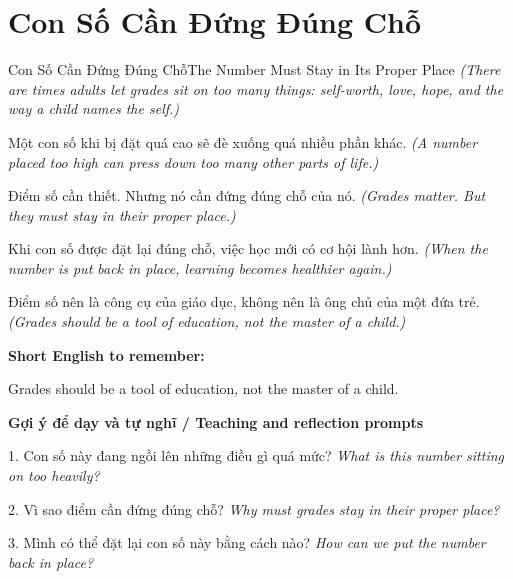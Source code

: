 \section{Con Số Cần Đứng Đúng Chỗ}
\begin{truyen}{Con Số Cần Đứng Đúng Chỗ}{The Number Must Stay in Its Proper Place}
\textit{(There are times adults let grades sit on too many things: self-worth, love, hope, and the way a child names the self.)}

Một con số khi bị đặt quá cao sẽ đè xuống quá nhiều phần khác.
\textit{(A number placed too high can press down too many other parts of life.)}

Điểm số cần thiết. Nhưng nó cần đứng đúng chỗ của nó.
\textit{(Grades matter. But they must stay in their proper place.)}

Khi con số được đặt lại đúng chỗ, việc học mới có cơ hội lành hơn.
\textit{(When the number is put back in place, learning becomes healthier again.)}

\end{truyen}

\begin{baihoc}
Điểm số nên là công cụ của giáo dục, không nên là ông chủ của một đứa trẻ.
\textit{(Grades should be a tool of education, not the master of a child.)}
\end{baihoc}

\begin{ghinhoanh}
\textbf{Short English to remember:}

Grades should be a tool of education, not the master of a child.

\end{ghinhoanh}

\begin{tuhocnhanh}
\textbf{Gợi ý để dạy và tự nghĩ / Teaching and reflection prompts}

1. Con số này đang ngồi lên những điều gì quá mức? \textit{What is this number sitting on too heavily?}

2. Vì sao điểm cần đứng đúng chỗ? \textit{Why must grades stay in their proper place?}

3. Mình có thể đặt lại con số này bằng cách nào? \textit{How can we put the number back in place?}
\end{tuhocnhanh}
